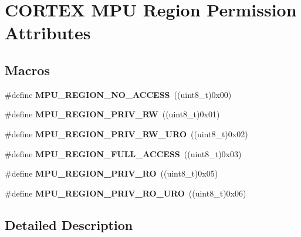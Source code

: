 \hypertarget{group___c_o_r_t_e_x___m_p_u___region___permission___attributes}{}\section{C\+O\+R\+T\+EX M\+PU Region Permission Attributes}
\label{group___c_o_r_t_e_x___m_p_u___region___permission___attributes}
\subsection*{Macros}
\begin{DoxyCompactItemize}
\item 
\#define {\bfseries M\+P\+U\+\_\+\+R\+E\+G\+I\+O\+N\+\_\+\+N\+O\+\_\+\+A\+C\+C\+E\+SS}~((uint8\+\_\+t)0x00)\hypertarget{group___c_o_r_t_e_x___m_p_u___region___permission___attributes_gaf63b0a8c02a232fab58d4d4883353edb}{}\label{group___c_o_r_t_e_x___m_p_u___region___permission___attributes_gaf63b0a8c02a232fab58d4d4883353edb}

\item 
\#define {\bfseries M\+P\+U\+\_\+\+R\+E\+G\+I\+O\+N\+\_\+\+P\+R\+I\+V\+\_\+\+RW}~((uint8\+\_\+t)0x01)\hypertarget{group___c_o_r_t_e_x___m_p_u___region___permission___attributes_ga5746cae941b1dc9e734772c0c6ff69f1}{}\label{group___c_o_r_t_e_x___m_p_u___region___permission___attributes_ga5746cae941b1dc9e734772c0c6ff69f1}

\item 
\#define {\bfseries M\+P\+U\+\_\+\+R\+E\+G\+I\+O\+N\+\_\+\+P\+R\+I\+V\+\_\+\+R\+W\+\_\+\+U\+RO}~((uint8\+\_\+t)0x02)\hypertarget{group___c_o_r_t_e_x___m_p_u___region___permission___attributes_ga3acd29acd538c47671517c0812ade7f7}{}\label{group___c_o_r_t_e_x___m_p_u___region___permission___attributes_ga3acd29acd538c47671517c0812ade7f7}

\item 
\#define {\bfseries M\+P\+U\+\_\+\+R\+E\+G\+I\+O\+N\+\_\+\+F\+U\+L\+L\+\_\+\+A\+C\+C\+E\+SS}~((uint8\+\_\+t)0x03)\hypertarget{group___c_o_r_t_e_x___m_p_u___region___permission___attributes_ga2fc4f8facab2310a5c2a2c4c744fdc3f}{}\label{group___c_o_r_t_e_x___m_p_u___region___permission___attributes_ga2fc4f8facab2310a5c2a2c4c744fdc3f}

\item 
\#define {\bfseries M\+P\+U\+\_\+\+R\+E\+G\+I\+O\+N\+\_\+\+P\+R\+I\+V\+\_\+\+RO}~((uint8\+\_\+t)0x05)\hypertarget{group___c_o_r_t_e_x___m_p_u___region___permission___attributes_ga0a80ac8cde302a1129696c2a719c2e9e}{}\label{group___c_o_r_t_e_x___m_p_u___region___permission___attributes_ga0a80ac8cde302a1129696c2a719c2e9e}

\item 
\#define {\bfseries M\+P\+U\+\_\+\+R\+E\+G\+I\+O\+N\+\_\+\+P\+R\+I\+V\+\_\+\+R\+O\+\_\+\+U\+RO}~((uint8\+\_\+t)0x06)\hypertarget{group___c_o_r_t_e_x___m_p_u___region___permission___attributes_ga197d091a8eb469d7ee0cc15c9c110e2a}{}\label{group___c_o_r_t_e_x___m_p_u___region___permission___attributes_ga197d091a8eb469d7ee0cc15c9c110e2a}

\end{DoxyCompactItemize}


\subsection{Detailed Description}
